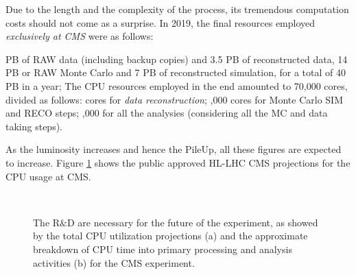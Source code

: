Due to the length and the complexity of the process, its tremendous computation costs should not come as a surprise. In 2019, the final resources employed \emph{exclusively at CMS} were as follows:

\begin{outline}
     PB of RAW data (including backup copies) and 3.5 PB of reconstructed data, 14 PB or RAW Monte Carlo and 7 PB of reconstructed simulation, for a total of 40 PB in a year;
    \1 The CPU resources employed in the end amounted to 70,000 cores, divided as follows:
     cores for \emph{data reconstruction};
    ,000 cores for Monte Carlo SIM and RECO steps;
    ,000 for all the analysies (considering all the MC and data taking steps).
\end{outline}

As the luminosity increases and hence the PileUp, all these figures are expected to increase.
Figure \ref{fig:cpuusage} shows the public approved HL-LHC CMS projections for the CPU usage at CMS.

\begin{figure}
    \myfloatalign
     \\
    \caption[Computing estimates]{The R$\&$D are necessary for the future of the experiment, as showed by the total CPU utilization projections (a) and the approximate breakdown of CPU time into primary processing and analysis activities (b) for the CMS experiment.}\label{fig:cpuusage}
\end{figure}

